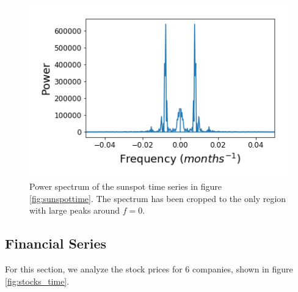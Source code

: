 \message{ !name(Assn2.tex)}\documentclass[twocolumn]{article}
\begin{document}
\begin{figure}
\centering
\includegraphics[width=\linewidth]{SunSpotPowerSpectrum}
\caption{Power spectrum of the sunspot time series in figure \ref{fig:sunspottime}. The spectrum has been cropped to the only region with large peaks around $f=0$.}
\label{fig:SunSpotPowerSpectrum}
\end{figure}

\subsection{Financial Series}
For this section, we analyze the stock prices for 6 companies, shown in figure
\ref{fig:stocks_time}.
\end{document}
